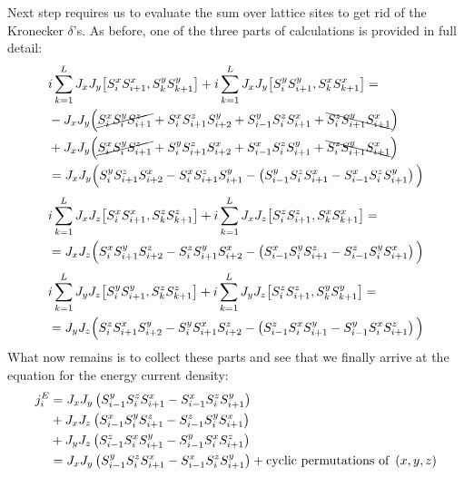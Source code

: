 Next step requires us to evaluate the sum over lattice sites to get rid of the Kronecker \(\delta{}\)'s. As before, one of the three parts of calculations is provided in full detail:
\begin{align*}
    &i\sum_{k=1}^{L}  J_{x} J_{y}\comm{\Sx_{i}\Sx_{i+1}}{\Sy_{k}\Sy_{k+1}} + i\sum_{k=1}^{L} J_{x} J_{y}\comm{\Sy_{i}\Sy_{i+1}}{\Sx_{k}\Sx_{k+1}} = \\
    & - J_x J_y \Big( \cancel{\Sx_i \Sy_i \Sz_{i+1}} +  \Sx_i \Sz_{i+1} \Sy_{i+2} + \Sy_{i-1} \Sz_i \Sx_{i+1} +\bcancel{\Sz_i \Sy_{i+1} \Sx_{i+1}}\Big)\\
    &+  J_x J_y \Big(  \cancel{\Sx_i \Sy_i \Sz_{i+1}} + \Sy_i \Sz_{i+1} \Sx_{i+2} + \Sx_{i-1} \Sz_i \Sy_{i+1} + \bcancel{\Sz_i \Sy_{i+1} \Sx_{i+1}}\Big)\\
    &= J_x J_y \Big( \Sy_i \Sz_{i+1} \Sx_{i+2} - \Sx_i \Sz_{i+1} \Sy_{i+1} - \left(\Sy_{i-1}\Sz_i \Sx_{i+1} - \Sx_{i-1}\Sz_{i}\Sy_{i+1}\right) \Big)
\end{align*}
\begin{align*}
    &i\sum_{k=1}^{L}  J_{x} J_{z}\comm{\Sx_{i}\Sx_{i+1}}{\Sz_{k}\Sz_{k+1}} + i\sum_{k=1}^{L} J_{x} J_{z}\comm{\Sz_{i}\Sz_{i+1}}{\Sx_{k}\Sx_{k+1}} = \\
    &= J_x J_z \Big( \Sx_i \Sy_{i+1} \Sz_{i+2} - \Sz_i \Sy_{i+1} \Sx_{i+2} - \left(\Sx_{i-1}\Sy_i \Sz_{i+1} - \Sz_{i-1}\Sy_{i}\Sx_{i+1}\right) \Big)
\end{align*}
\begin{align*}    
    &i\sum_{k=1}^{L}  J_{y} J_{z}\comm{\Sy_{i}\Sy_{i+1}}{\Sz_{k}\Sz_{k+1}} + i\sum_{k=1}^{L} J_{y} J_{z}\comm{\Sz_{i}\Sz_{i+1}}{\Sy_{k}\Sy_{k+1}} = \\
    &= J_y J_z \Big( \Sz_i \Sx_{i+1} \Sy_{i+2} - \Sy_i \Sx_{i+1} \Sz_{i+2} - \left(\Sz_{i-1}\Sx_i \Sy_{i+1} - \Sy_{i-1}\Sx_{i}\Sz_{i+1}\right) \Big)
\end{align*}
What now remains is to collect these parts and see that we finally arrive at the equation for the energy current density:
\begin{align}
    j_i^E &= J_x J_y \left(S^{y}_{i-1}S^{z}_i S^{x}_{i+1} - S^{x}_{i-1}S^{z}_{i}S^{y}_{i+1}\right) \nonumber\\
    &+ J_x J_z \left(S^{x}_{i-1}S^{y}_i S^{z}_{i+1} - S^{z}_{i-1}S^{y}_{i}S^{x}_{i+1}\right) \nonumber \\
    &+ J_y J_z \left(S^{z}_{i-1}S^{x}_i S^{y}_{i+1} - S^{y}_{i-1}S^{x}_{i}S^{z}_{i+1}\right) \nonumber \\
    &= J_x J_y \left(S^{y}_{i-1}S^{z}_i S^{x}_{i+1} - S^{x}_{i-1}S^{z}_{i}S^{y}_{i+1}\right) + \text{cyclic permutations of } \left(x,y,z\right)
    \label{eq:energy current density}
\end{align}
